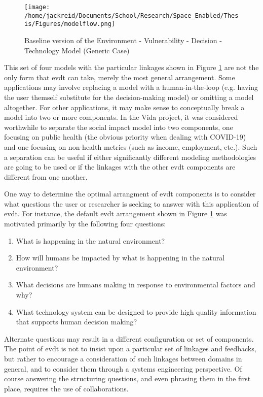 \documentclass[notitlepage]{article}
\begin{document}
\begin{figure}[h]
    \centering
    \texttt{[image: /home/jackreid/Documents/School/Research/Space\_Enabled/Thesis/Figures/modelflow.png]}
    \caption{ Baseline version of the Environment - Vulnerability - Decision - Technology Model (Generic Case)}
    \label{fig:model}
\end{figure}

This set of four models with the particular linkages shown in Figure \ref{fig:model} are not the only form that \ac{evdt} can take, merely the most general arrangement. Some applications may involve replacing a model with a human-in-the-loop (e.g. having the user themself substitute for the decision-making model) or omitting a model altogether. For other applications, it may make sense to conceptually break a model into two or more components. In the Vida project, it was considered worthwhile to separate the social impact model into two components, one focusing on public health (the obvious priority when dealing with COVID-19) and one focusing on non-health metrics (such as income, employment, etc.). Such a separation can be useful if either significantly different modeling methodologies are going to be used or if the linkages with the other \ac{evdt} components are different from one another. 

One way to determine the optimal arrangment of \ac{evdt} components is to consider what questions the user or researcher is seeking to answer with this application of \ac{evdt}. For instance, the default \ac{evdt} arrangement shown in Figure \ref{fig:model} was motivated primarily by the following four questions:

\begin{enumerate} \setlength{\itemsep}{0pt} \setlength{\parskip}{0pt}
    \item What is happening in the natural environment?
    \item How will humans be impacted by what is happening in the natural environment?
    \item What decisions are humans making in response to environmental factors and why?
    \item What technology system can be designed to provide high quality information that supports human decision making?
\end{enumerate}

Alternate questions may result in a different configuration or set of components. The point of \ac{evdt} is not to insist upon a particular set of linkages and feedbacks, but rather to encourage a consideration of such linkages between domains in general, and to consider them through a systems engineering perspective. Of course answering the structuring questions, and even phrasing them in the first place, requires the use of collaborations. 
\end{document}
